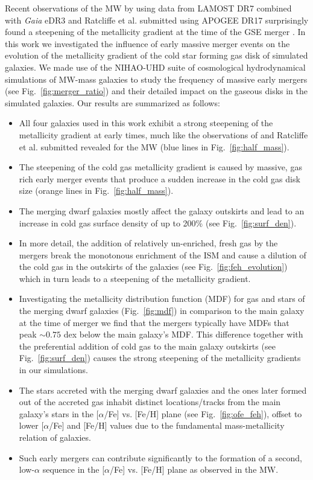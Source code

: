 \documentclass[useAMS,usenatbib]{mnras}
\begin{document}
Recent observations of the MW by \citet{Lu2022b} using data from LAMOST DR7 combined with {\it Gaia} eDR3 and Ratcliffe et al. submitted using APOGEE DR17 surprisingly found a steepening of the metallicity gradient at the time of the GSE merger \citep{Belokurov2018, Helmi2018}. In this work we investigated the influence of early massive merger events on the evolution of the metallicity gradient of the cold star forming gas disk of simulated galaxies. We made use of the NIHAO-UHD suite \citep{Buck2020} of cosmological hydrodynamical simulations of MW-mass galaxies to study the frequency of massive early mergers (see Fig.~\ref{fig:merger_ratio}) and their detailed impact on the gaseous disks in the simulated galaxies. Our results are summarized as follows:
\begin{itemize}
%
\item All four galaxies used in this work exhibit a strong steepening of the metallicity gradient at early times, much like the observations of \citet{Lu2022b} and Ratcliffe et al. submitted revealed for the MW (blue lines in Fig.~\ref{fig:half_mass}).  
%
\item The steepening of the cold gas metallicity gradient is caused by massive, gas rich early merger events that produce a sudden increase in the cold gas disk size (orange lines in Fig.~\ref{fig:half_mass}).
%
\item The merging dwarf galaxies mostly affect the galaxy outskirts and lead to an increase in cold gas surface density of up to 200\% (see Fig.~\ref{fig:surf_den}).
%
\item In more detail, the addition of relatively un-enriched, fresh gas by the mergers break the monotonous enrichment of the ISM and cause a dilution of the cold gas in the outskirts of the galaxies (see Fig.~\ref{fig:feh_evolution}) which in turn leads to a steepening of the metallicity gradient.
%
\item Investigating the metallicity distribution function (MDF) for gas and stars of the merging dwarf galaxies (Fig.~\ref{fig:mdf}) in comparison to the main galaxy at the time of merger we find that the mergers typically have MDFs that peak $\sim0.75$ dex below the main galaxy's MDF. This difference together with the preferential addition of cold gas to the main galaxy outskirts (see Fig.~\ref{fig:surf_den}) causes the strong steepening of the metallicity gradients in our simulations.
%
\item The stars accreted with the merging dwarf galaxies and the ones later formed out of the accreted gas inhabit distinct locations/tracks from the main galaxy's stars in the [$\alpha$/Fe] vs. [Fe/H] plane (see Fig.~\ref{fig:ofe_feh}), offset to lower [$\alpha$/Fe] and [Fe/H] values due to the fundamental mass-metallicity relation of galaxies. 
%
\item Such early mergers can contribute significantly to the formation of a second, low-$\alpha$ sequence in the [$\alpha$/Fe] vs. [Fe/H] plane as observed in the MW.  
\end{itemize}
\end{document}
